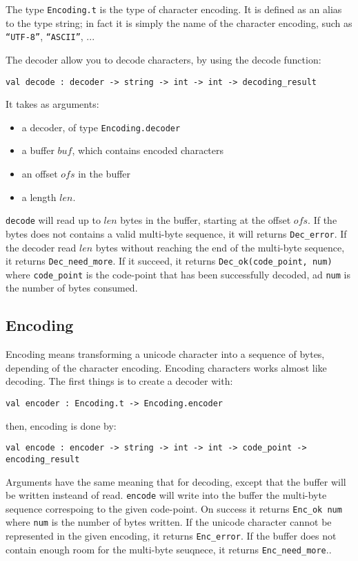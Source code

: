 \documentclass{article}
\begin{document}
The type \texttt{Encoding.t} is the type of character encoding. It is
defined as an alias to the type string; in fact it is simply the name
of the character encoding, such as \texttt{``UTF-8''},
\texttt{``ASCII''}, ...

The decoder allow you to decode characters, by using the decode
function:

\begin{verbatim}
val decode : decoder -> string -> int -> int -> decoding_result
\end{verbatim}

It takes as arguments:
\begin{itemize}
\item a decoder, of type \texttt{Encoding.decoder}
\item a buffer $buf$, which contains encoded characters
\item an offset $ofs$ in the buffer
\item a length $len$.
\end{itemize}

\texttt{decode} will read up to $len$ bytes in the buffer, starting at
the offset $ofs$. If the bytes does not contains a valid multi-byte
sequence, it will returns \texttt{Dec\_error}. If the decoder read
$len$ bytes without reaching the end of the multi-byte sequence, it
returns \texttt{Dec\_need\_more}. If it succeed, it returns
\texttt{Dec\_ok(code\_point, num)} where \texttt{code\_point} is the
code-point that has been successfully decoded, ad \texttt{num} is the
number of bytes consumed.

\subsection{Encoding}

Encoding means transforming a unicode character into a sequence of
bytes, depending of the character encoding. Encoding characters works
almost like decoding. The first things is to create a decoder with:

\begin{verbatim}
val encoder : Encoding.t -> Encoding.encoder
\end{verbatim}

then, encoding is done by:

\begin{verbatim}
val encode : encoder -> string -> int -> int -> code_point -> encoding_result
\end{verbatim}

Arguments have the same meaning that for decoding, except that the
buffer will be written insteand of read. \texttt{encode} will write
into the buffer the multi-byte sequence correspoing to the given
code-point. On success it returns \texttt{Enc\_ok num} where
\texttt{num} is the number of bytes written. If the unicode character
cannot be represented in the given encoding, it returns
\texttt{Enc\_error}. If the buffer does not contain enough room for
the multi-byte seuqnece, it returns \texttt{Enc\_need\_more}..
\end{document}
